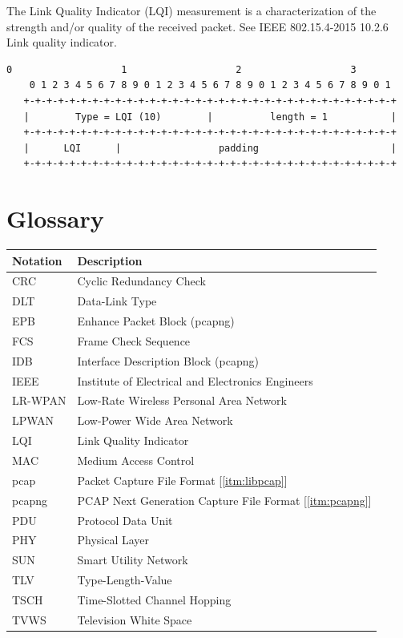 \documentclass[12pt]{article}
\renewcommand\_{\textunderscore\allowbreak}
\begin{document}
The Link Quality Indicator (LQI) measurement is a characterization of the
strength and/or quality of the received packet.  See IEEE 802.15.4-2015 10.2.6
Link quality indicator.

\begin{Verbatim}[samepage=true]
    0                   1                   2                   3
    0 1 2 3 4 5 6 7 8 9 0 1 2 3 4 5 6 7 8 9 0 1 2 3 4 5 6 7 8 9 0 1
   +-+-+-+-+-+-+-+-+-+-+-+-+-+-+-+-+-+-+-+-+-+-+-+-+-+-+-+-+-+-+-+-+
   |        Type = LQI (10)        |          length = 1           |
   +-+-+-+-+-+-+-+-+-+-+-+-+-+-+-+-+-+-+-+-+-+-+-+-+-+-+-+-+-+-+-+-+
   |      LQI      |                 padding                       |
   +-+-+-+-+-+-+-+-+-+-+-+-+-+-+-+-+-+-+-+-+-+-+-+-+-+-+-+-+-+-+-+-+
\end{Verbatim}


\newpage
\section{Glossary}\label{sec:glos}
\begin{center}
\begin{tabular}{ |p{3cm}|p{10cm}| }
\hline
\textbf{Notation}   &  \textbf{Description}\\
\hline
CRC                 &  Cyclic Redundancy Check\\
\hline
DLT                 &  Data-Link Type\\
\hline
EPB                 &  Enhance Packet Block (pcapng)\\
\hline
FCS                 &  Frame Check Sequence\\
\hline
IDB                 &  Interface Description Block (pcapng)\\
\hline
IEEE                &  Institute of Electrical and Electronics Engineers\\
\hline
LR-WPAN             &  Low-Rate Wireless Personal Area Network\\
\hline
LPWAN               &  Low-Power Wide Area Network\\
\hline
LQI                 &  Link Quality Indicator\\
\hline
MAC                 &  Medium Access Control\\
\hline
pcap                &  Packet Capture File Format [\ref{itm:libpcap}]\\
\hline
pcapng              &  PCAP Next Generation Capture File Format [\ref{itm:pcapng}]\\
\hline
PDU                 &  Protocol Data Unit\\
\hline
PHY                 &  Physical Layer\\
\hline
SUN                 &  Smart Utility Network\\
\hline
TLV                 &  Type-Length-Value\\
\hline
TSCH                &  Time-Slotted Channel Hopping\\
\hline
TVWS                &  Television White Space\\
\hline
\end{tabular}
\end{center}
\end{document}
